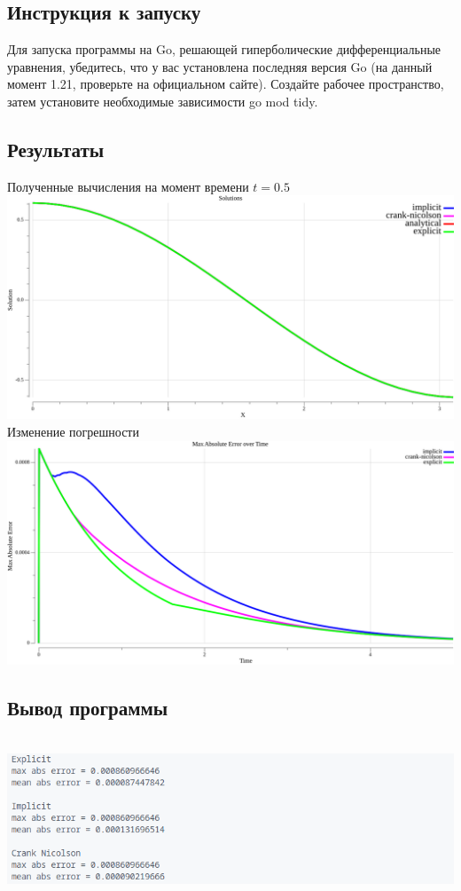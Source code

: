 \documentclass{article}
\begin{document}
\subsection*{Инструкция к запуску}
Для запуска программы на Go, решающей гиперболические дифференциальные уравнения, убедитесь, что у вас установлена последняя версия Go 
(на данный момент 1.21, проверьте на официальном сайте). Создайте рабочее пространство, затем установите необходимые зависимости go mod tidy.

\pagebreak
\subsection*{Результаты}
\begin{center}
Полученные вычисления на момент времени $ t = 0.5 $
\\
\includegraphics[scale=0.4]{solutions.png}
\\


Изменение погрешности
\\
\includegraphics[scale=0.4]{error_plot.png}
\end{center}

\pagebreak
\subsection*{Вывод программы}
\\
\includegraphics[scale=0.6]{console.png}
\\
\end{document}
